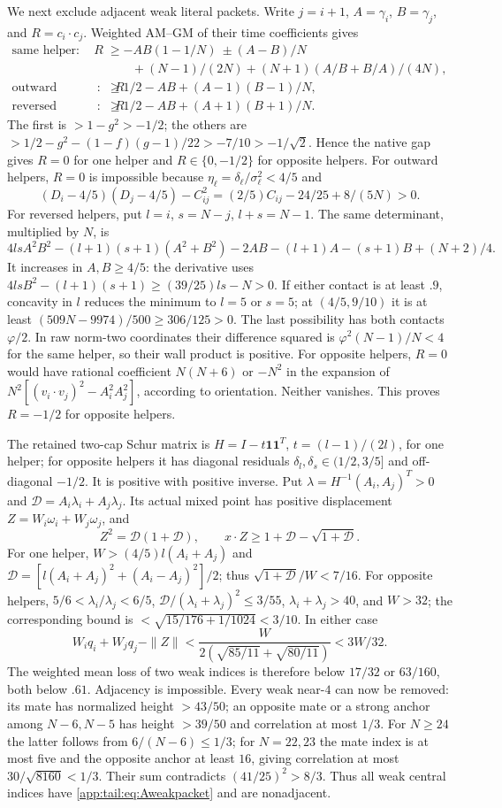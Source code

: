 \documentclass[11pt]{article}
\theoremstyle{definition}
\theoremstyle{remark}
\newcommand{\ph}{\varphi}
\begin{document}
We next exclude adjacent weak literal packets. Write $j=i+1$,
$A=\gamma_i$, $B=\gamma_j$, and $R=c_i\cdot c_j$.
Weighted AM--GM of their time coefficients gives
\[
\begin{aligned}
\text{same helper}:\quad R&\ge-AB(1-1/N)\ \pm(A-B)/N\\
 &\qquad +(N-1)/(2N)+(N+1)(A/B+B/A)/(4N),\\
\text{outward helpers}:\quad R&\ge1/2-AB+(A-1)(B-1)/N,\\
\text{reversed helpers}:\quad R&\ge1/2-AB+(A+1)(B+1)/N.
\end{aligned}
\]
The first is $>1-g^2>-1/2$; the others are
$>1/2-g^2-(1-f)(g-1)/22>-7/10>-1/\sqrt2$.
Hence the native gap gives $R=0$ for one helper and
$R\in\{0,-1/2\}$ for opposite helpers.
For outward helpers, $R=0$ is impossible because
$\eta_\ell=\delta_\ell/\sigma_\ell^2<4/5$ and
\[
 (D_i-4/5)(D_j-4/5)-C_{ij}^2
       =(2/5)C_{ij}-24/25+8/(5N)>0.
\]
For reversed helpers, put $l=i$, $s=N-j$, $l+s=N-1$.
The same determinant, multiplied by $N$, is
\[
 4lsA^2B^2-(l+1)(s+1)(A^2+B^2)-2AB
 -(l+1)A-(s+1)B+(N+2)/4.
\]
It increases in $A,B\ge4/5$: the derivative uses
$4lsB^2-(l+1)(s+1)\ge(39/25)ls-N>0$.
If either contact is at least $.9$, concavity in $l$ reduces the
minimum to $l=5$ or $s=5$; at $(4/5,9/10)$ it is at least
$(509N-9974)/500\ge306/125>0$.
The last possibility has both contacts $\ph/2$.
In raw norm-two coordinates their difference squared is
$\ph^2(N-1)/N<4$ for the same helper, so their wall product is
positive. For opposite helpers, $R=0$ would have rational coefficient
$N(N+6)$ or $-N^2$ in the expansion of
$N^2[(v_i\cdot v_j)^2-A_i^2A_j^2]$, according to orientation.
Neither vanishes. This proves $R=-1/2$ for opposite helpers.

The retained two-cap Schur matrix is
$H=I-t\mathbf1\mathbf1^T$, $t=(l-1)/(2l)$, for one helper;
for opposite helpers it has diagonal residuals
$\delta_l,\delta_s\in(1/2,3/5]$ and off-diagonal $-1/2$.
It is positive with positive inverse. Put
$\lambda=H^{-1}(A_i,A_j)^T>0$ and
$\mathcal D=A_i\lambda_i+A_j\lambda_j$.
Its actual mixed point has positive displacement
$Z=W_i\omega_i+W_j\omega_j$, and
\[
 Z^2=\mathcal D(1+\mathcal D),\qquad
 x\cdot Z\ge1+\mathcal D-\sqrt{1+\mathcal D}.
\]
For one helper, $W>(4/5)l(A_i+A_j)$ and
$\mathcal D=[l(A_i+A_j)^2+(A_i-A_j)^2]/2$;
thus $\sqrt{1+\mathcal D}/W<7/16$.
For opposite helpers, $5/6<\lambda_i/\lambda_j<6/5$,
$\mathcal D/(\lambda_i+\lambda_j)^2\le3/55$,
$\lambda_i+\lambda_j>40$, and $W>32$;
the corresponding bound is $<\sqrt{15/176+1/1024}<3/10$.
In either case
\[
 W_iq_i+W_jq_j-\|Z\|
 <\frac{W}{2(\sqrt{85/11}+\sqrt{80/11})}<3W/32.
\]
The weighted mean loss of two weak indices is therefore below
$17/32$ or $63/160$, both below $.61$. Adjacency is impossible.
Every weak near-$4$ can now be removed: its mate has normalized
height $>43/50$; an opposite mate or a strong anchor among
$N-6,N-5$ has height $>39/50$ and correlation at most $1/3$.
For $N\ge24$ the latter follows from $6/(N-6)\le1/3$;
for $N=22,23$ the mate index is at most five and the opposite
anchor at least $16$, giving correlation at most
$30/\sqrt{8160}<1/3$.
Their sum contradicts $(41/25)^2>8/3$.
Thus all weak central indices have \eqref{app:tail:eq:Aweakpacket} and
are nonadjacent.
\end{document}
